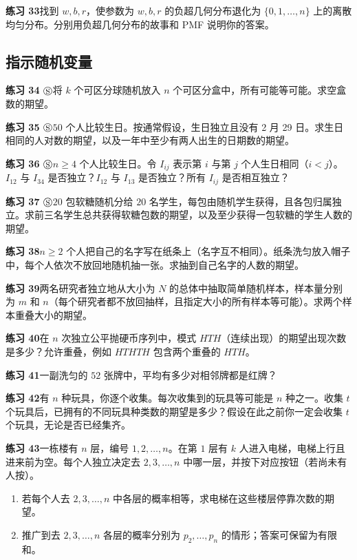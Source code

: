 \documentclass[UTF8, 12pt, fontset=fandol, oneside]{ctexart}
\begin{document}
\noindent\textbf{练习 33}\quad 找到 $w,b,r$，使参数为 $w,b,r$ 的负超几何分布退化为 $\{0,1,\ldots,n\}$ 上的离散均匀分布。分别用负超几何分布的故事和 PMF 说明你的答案。

\subsection*{指示随机变量}

\noindent\textbf{练习 34 $\circledS$}\quad 将 $k$ 个可区分球随机放入 $n$ 个可区分盒中，所有可能等可能。求空盒数的期望。

\noindent\textbf{练习 35 $\circledS$}\quad $50$ 个人比较生日。按通常假设，生日独立且没有 2 月 29 日。求生日相同的人对数的期望，以及一年中至少有两人出生的日期数的期望。

\noindent\textbf{练习 36 $\circledS$}\quad $n\ge4$ 个人比较生日。令 $I_{ij}$ 表示第 $i$ 与第 $j$ 个人生日相同（$i<j$）。$I_{12}$ 与 $I_{34}$ 是否独立？$I_{12}$ 与 $I_{13}$ 是否独立？所有 $I_{ij}$ 是否相互独立？

\noindent\textbf{练习 37 $\circledS$}\quad $20$ 包软糖随机分给 $20$ 名学生，每包由随机学生获得，且各包归属独立。求前三名学生总共获得软糖包数的期望，以及至少获得一包软糖的学生人数的期望。

\noindent\textbf{练习 38}\quad $n\ge2$ 个人把自己的名字写在纸条上（名字互不相同）。纸条洗匀放入帽子中，每个人依次不放回地随机抽一张。求抽到自己名字的人数的期望。

\noindent\textbf{练习 39}\quad 两名研究者独立地从大小为 $N$ 的总体中抽取简单随机样本，样本量分别为 $m$ 和 $n$（每个研究者都不放回抽样，且指定大小的所有样本等可能）。求两个样本重叠大小的期望。

\noindent\textbf{练习 40}\quad 在 $n$ 次独立公平抛硬币序列中，模式 $HTH$（连续出现）的期望出现次数是多少？允许重叠，例如 $HTHTH$ 包含两个重叠的 $HTH$。

\noindent\textbf{练习 41}\quad 一副洗匀的 $52$ 张牌中，平均有多少对相邻牌都是红牌？

\noindent\textbf{练习 42}\quad 有 $n$ 种玩具，你逐个收集。每次收集到的玩具等可能是 $n$ 种之一。收集 $t$ 个玩具后，已拥有的不同玩具种类数的期望是多少？假设在此之前你一定会收集 $t$ 个玩具，无论是否已经集齐。

\noindent\textbf{练习 43}\quad 一栋楼有 $n$ 层，编号 $1,2,\ldots,n$。在第 $1$ 层有 $k$ 人进入电梯，电梯上行且进来前为空。每个人独立决定去 $2,3,\ldots,n$ 中哪一层，并按下对应按钮（若尚未有人按）。
\begin{enumerate}
  \item[(a)] 若每个人去 $2,3,\ldots,n$ 中各层的概率相等，求电梯在这些楼层停靠次数的期望。
  \item[(b)] 推广到去 $2,3,\ldots,n$ 各层的概率分别为 $p_2,\ldots,p_n$ 的情形；答案可保留为有限和。
\end{enumerate}
\end{document}
